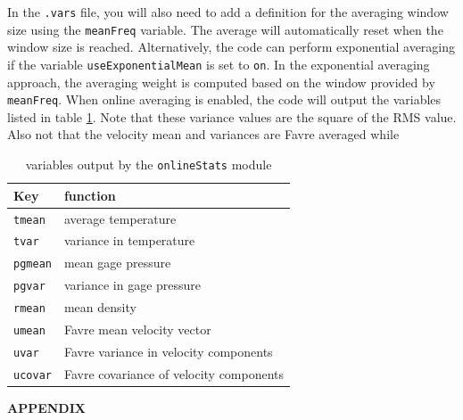 \documentclass{article}
\begin{document}
In the {\tt .vars} file, you will also need to add a definition for
the averaging window size using the {\tt meanFreq} variable.  The
average will automatically reset when the window size is reached.
Alternatively, the code can perform exponential averaging if the
variable {\tt useExponentialMean} is set to {\tt on}.  In the
exponential averaging approach, the averaging weight is computed based
on the window provided by {\tt meanFreq}.  When online averaging is
enabled, the code will output the variables listed in table
\ref{tab:onlinestats}.  Note that these variance values are the square
of the RMS value.  Also not that the velocity mean and variances are
Favre averaged while

\begin{table}[htbp]
  \begin{center}
    
    \leavevmode
    \begin{tabular}{|l|l|}
      \hline
      Key & function \\
      \hline
      {\tt tmean} & average temperature \\
      {\tt tvar} & variance in temperature \\
      {\tt pgmean} & mean gage pressure \\
      {\tt pgvar} & variance in gage pressure\\
      {\tt rmean} & mean density\\
      {\tt umean} & Favre mean velocity vector\\
      {\tt uvar} & Favre variance in velocity components\\
      {\tt ucovar} & Favre covariance of velocity components\\
      \hline
    \end{tabular}
    
    \caption{variables output by the {\tt onlineStats} module}
    \label{tab:onlinestats}
  \end{center}
\end{table}

\clearpage
\appendix
\def\V{\mathcal{V}}
\def\A{\mathcal{A}}

\begin{center}
{\huge \bf APPENDIX}
\end{center}







\end{document}
